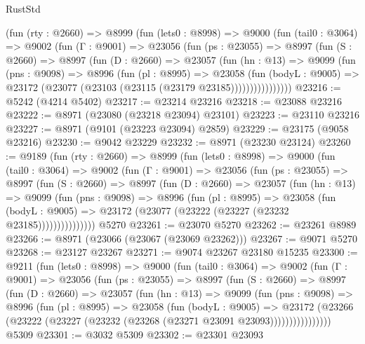 \begin{lexlean}{RustStd}
\begin{coremodule}
      (fun (rty : @2660) =>
      @8999
        (fun (lets0 : @8998) =>
        @9000
          (fun (tail0 : @3064) =>
          @9002
            (fun (Γ : @9001) =>
            @23056
              (fun (ps : @23055) =>
              @8997
                (fun (S : @2660) =>
                @8997
                  (fun (D : @2660) =>
                  @23057
                    (fun (hn : @13) =>
                    @9099
                      (fun (pns : @9098) =>
                      @8996
                        (fun (pl : @8995) =>
                        @23058
                          (fun (bodyL : @9005) =>
                          @23172 (@23077 (@23103 (@23115 (@23179 @23185))))))))))))))))
@23216 := @5242 (@4214 @5402)
@23217 := @23214 @23216
@23218 := @23088 @23216
@23222 := @8971 (@23080 (@23218 @23094) @23101)
@23223 := @23110 @23216
@23227 := @8971 (@9101 (@23223 @23094) @2859)
@23229 := @23175 (@9058 @23216)
@23230 := @9042 @23229
@23232 := @8971 (@23230 @23124)
@23260 := @9189
    (fun (rty : @2660) =>
    @8999
      (fun (lets0 : @8998) =>
      @9000
        (fun (tail0 : @3064) =>
        @9002
          (fun (Γ : @9001) =>
          @23056
            (fun (ps : @23055) =>
            @8997
              (fun (S : @2660) =>
              @8997
                (fun (D : @2660) =>
                @23057
                  (fun (hn : @13) =>
                  @9099
                    (fun (pns : @9098) =>
                    @8996
                      (fun (pl : @8995) =>
                      @23058
                        (fun (bodyL : @9005) =>
                        @23172 (@23077 (@23222 (@23227 (@23232 @23185)))))))))))))))
    @5270
@23261 := @23070 @5270
@23262 := @23261 @8989
@23266 := @8971 (@23066 (@23067 (@23069 @23262)))
@23267 := @9071 @5270
@23268 := @23127 @23267
@23271 := @9074 @23267 @23180 @15235
@23300 := @9211
    (fun (lets0 : @8998) =>
    @9000
      (fun (tail0 : @3064) =>
      @9002
        (fun (Γ : @9001) =>
        @23056
          (fun (ps : @23055) =>
          @8997
            (fun (S : @2660) =>
            @8997
              (fun (D : @2660) =>
              @23057
                (fun (hn : @13) =>
                @9099
                  (fun (pns : @9098) =>
                  @8996
                    (fun (pl : @8995) =>
                    @23058
                      (fun (bodyL : @9005) =>
                      @23172
                        (@23266
                          (@23222 (@23227 (@23232 (@23268 (@23271 @23091 @23093))))))))))))))))
    @5309
@23301 := @3032 @5309
@23302 := @23301 @23093

\end{coremodule}
\end{lexlean}
